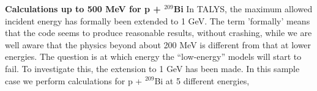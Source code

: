 \begin{samplecase}
{\bf Calculations up to 500 MeV for p + ${}^{209}$Bi}\newline
In TALYS, the maximum allowed incident energy has formally been extended to 1 GeV. 
The term 'formally' means that the code seems to produce reasonable results, without 
crashing, while we are well aware that the physics beyond about 200 MeV is different 
from that at lower energies. The question is at which energy 
the ``low-energy'' models will 
start to fail. To investigate this, the extension to 1 GeV has been made.
In this sample case we perform calculations for p + ${}^{209}$Bi at 5 different 
energies,


\end{samplecase}
